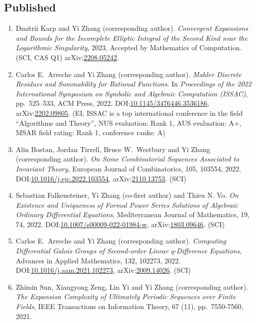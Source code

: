 \documentclass[a4paper,12pt]{article}
\begin{document}
\subsection*{Published}
\begin{enumerate}
\item Dmitrii Karp and Yi Zhang (corresponding author). {\em Convergent Expansions and Bounds for the Incomplete Elliptic Integral of the Second Kind near the Logarithmic Singularity}, 2023, Accepted by Mathematics of Computation. (SCI, CAS Q1)
arXiv:\href{https://arxiv.org/abs/2208.05242}{2208.05242}. 
\item Carlos E.\ Arreche and Yi Zhang (corresponding author). 
{\em Mahler Discrete Residues and Summability for Rational Functions}. In {\em Proceedings of the 2022 International Symposium on Symbolic and Algebraic Computation (ISSAC)}, 
pp.\ 525–533, ACM Press, 2022. DOI:\href{https://dl.acm.org/doi/10.1145/3476446.3536186}{10.1145/3476446.3536186},
arXiv:\href{https://arxiv.org/abs/2202.09805}{2202.09805}.  (EI, ISSAC is a top international conference in the field ``Algorithms and Theory'', NUS evaluation: Rank 1, AUS evaluation: A+, MSAR field rating: Rank 1, conference ranks: A) 
\item Alin Bostan, Jordan Tirrell, Bruce W.\ Westbury and Yi Zhang (corresponding author). 
{\em On Some Combinatorial Sequences Associated to Invariant Theory}, European Journal of Combinatorics, 105, 103554, 2022. 
DOI:\href{https://doi.org/10.1016/j.ejc.2022.103554}{10.1016/j.ejc.2022.103554}, 
 arXiv:\href{https://arxiv.org/abs/2110.13753}{2110.13753}.  (SCI)
\item Sebastian Falkensteiner, Yi Zhang (co-first author) and Thieu N. Vo. 
{\em On Existence and Uniqueness of Formal Power Series Solutions of Algebraic Ordinary
     Differential Equations},  Mediterranean Journal of Mathematics, 19, 74, 2022. 
DOI:\href{https://doi.org/10.1007/s00009-022-01984-w}{10.1007/s00009-022-01984-w}, 
arXiv:\href{https://arxiv.org/abs/1803.09646}{1803.09646}. (SCI) 
\item Carlos E.\ Arreche and Yi Zhang (corresponding author). 
{\em Computing Differential Galois Groups of Second-order Linear q-Difference Equations}, Advances in Applied Mathematics, 132, 102273, 2022. 
DOI:\href{https://doi.org/10.1016/j.aam.2021.102273}{10.1016/j.aam.2021.102273}, 
arXiv:\href{https://arxiv.org/abs/2009.14026}{2009.14026}. (SCI)
\item Zhimin Sun,  Xiangyong Zeng, Lin Yi and Yi Zhang (corresponding author). 
{\em The Expansion Complexity of Ultimately Periodic Sequences over Finite Fields},  IEEE Transactions on Information Theory, 67 (11), pp.\ 7550-7560, 2021. \\ 

\end{enumerate}
\end{document}
